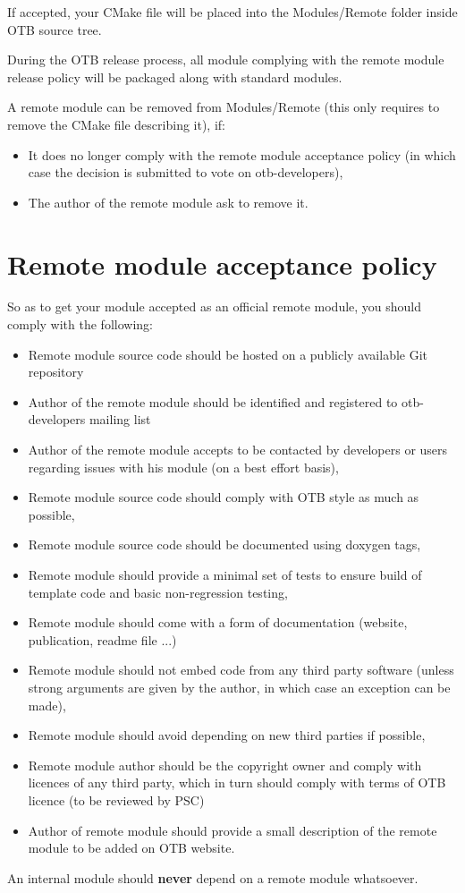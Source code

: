 If accepted, your CMake file will be placed into the Modules/Remote folder inside OTB source tree.

During the OTB release process, all module complying with the remote module release policy will be packaged along with standard modules.

A remote module can be removed from Modules/Remote (this only requires to remove the CMake file describing it), if: 

\begin{itemize}
       \item  It does no longer comply with the remote module acceptance policy (in which case the decision is submitted to vote on otb-developers), 
       \item  The author of the remote module ask to remove it. 
\end{itemize}

\section{Remote module acceptance policy }

So as to get your module accepted as an official remote module, you should comply with the following:
\begin{itemize}
	\item Remote module source code should be hosted on a publicly available Git repository
	\item Author of the remote module should be identified and registered to otb-developers mailing list
	\item Author of the remote module accepts to be contacted by developers or users regarding issues with his module (on a best effort basis),
	\item Remote module source code should comply with OTB style as much as possible,
	\item Remote module source code should be documented using doxygen tags,
	\item Remote module should provide a minimal set of tests to ensure build of template code and basic non-regression testing,
	\item Remote module should come with a form of documentation (website, publication, readme file ...)
	\item Remote module should not embed code from any third party software (unless strong arguments are given by the author, in which case an exception can be made),
	\item Remote module should avoid depending on new third parties if possible,
	\item Remote module author should be the copyright owner and comply with licences of any third party, which in turn should comply with terms of OTB licence (to be reviewed by PSC)
	\item Author of remote module should provide a small description of the remote module to be added on OTB website. 
\end{itemize}
An internal module should \textbf{never} depend on a remote module whatsoever. 

